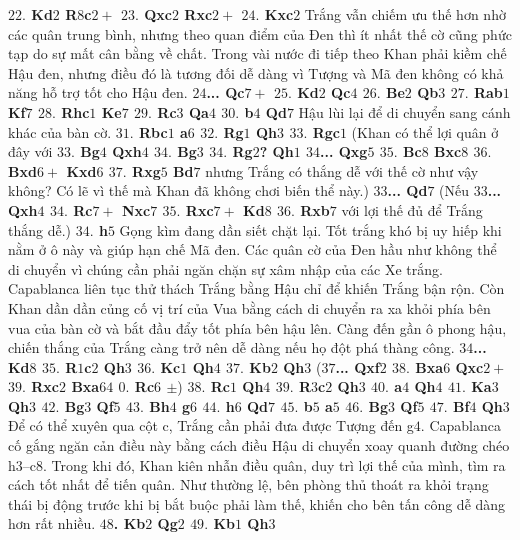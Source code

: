 \begin{multicols}{2}
	\vskip 0.1cm
	\textbf{\color{gocco}$22.$ Kd$2$ R$8$c$2+$ $23.$ Qxc$2$ Rxc$2+$ $24.$ Kxc$2$} Trắng vẫn chiếm ưu thế hơn nhờ các quân trung bình, nhưng theo quan điểm của Đen thì ít nhất thế cờ cũng phức tạp do sự mất cân bằng về chất. Trong vài nước đi tiếp theo Khan phải kiềm chế Hậu đen, nhưng điều đó là tương đối dễ dàng vì Tượng và Mã đen không có khả năng hỗ trợ tốt cho Hậu đen. 
	\vskip 0.1cm
	\textbf{\color{gocco}$24$... Qc$7+$ $25.$ Kd$2$ Qc$4$ $26.$ Be$2$ Qb$3$ $27.$ Rab$1$ Kf$7$ $28.$ Rhc$1$ Ke$7$ $29.$ Rc$3$ Qa$4$ $30.$ b$4$ Qd$7$} Hậu lùi lại để di chuyển sang cánh khác của bàn cờ. \textbf{\color{gocco}$31.$ Rbc$1$ a$6$ $32.$ Rg$1$ Qh$3$ $33.$ Rgc$1$} 
	\vskip 0.1cm
	(Khan có thể lợi quân ở đây với \textbf{\color{gocco}$33.$ Bg$4$ Qxh$4$ $34.$ Bg$3$ $34.$ Rg$2$? Qh$1$ $34$... Qxg$5$ $35.$ Bc$8$ Bxc$8$ $36.$ Bxd$6+$ Kxd$6$ $37.$ Rxg$5$ Bd$7$} nhưng Trắng có thắng dễ với thế cờ như vậy không? Có lẽ vì thế mà Khan đã không chơi biến thể này.) 
	\vskip 0.1cm
	\textbf{\color{gocco}$33$... Qd$7$} 
	(Nếu \textbf{\color{gocco}$33$... Qxh$4$ $34.$ Rc$7+$ Nxc$7$ $35.$ Rxc$7+$ Kd$8$ $36.$ Rxb$7$} với lợi thế đủ để Trắng thắng dễ.)
	\vskip 0.1cm
	\textbf{\color{gocco}$34.$ h$5$} Gọng kìm đang dần siết chặt lại. Tốt trắng khó bị uy hiếp khi nằm ở ô này và giúp hạn chế Mã đen. Các quân cờ của Đen hầu như không thể di chuyển vì chúng cần phải ngăn chặn sự xâm nhập của các Xe trắng. Capablanca liên tục thử thách Trắng bằng Hậu chỉ để khiến Trắng bận rộn. Còn Khan dần dần củng cố vị trí của Vua bằng cách di chuyển ra xa khỏi phía bên vua của bàn cờ và bắt đầu đẩy tốt phía bên hậu lên. Càng đến gần ô phong hậu, chiến thắng của Trắng càng trở nên dễ dàng nếu họ đột phá thàng công.
	\vskip 0.1cm
	\textbf{\color{gocco}$34$... Kd$8$ $35.$ R$1$c$2$ Qh$3$ $36.$ Kc$1$ Qh$4$ $37.$ Kb$2$ Qh$3$} 
	\vskip 0.1cm
	(\textbf{\color{gocco}$37$... Qxf$2$ $38.$ Bxa$6$ Qxc$2+$ $39.$ Rxc$2$ Bxa$64$ $0.$ Rc$6$ $\pm$}) 
	\vskip 0.1cm
	\textbf{\color{gocco}$38.$ Rc$1$ Qh$4$ $39.$ R$3$c$2$ Qh$3$ $40.$ a$4$ Qh$4$ $41.$ Ka$3$ Qh$3$ $42.$ Bg$3$ Qf$5$ $43.$ Bh$4$ g$6$ $44.$ h$6$ Qd$7$ $45.$ b$5$ a$5$ $46.$ Bg$3$ Qf$5$ $47.$ Bf$4$ Qh$3$}
	\vskip 0.1cm
	Để có thể xuyên qua cột c, Trắng cần phải đưa được Tượng đến g$4$. Capablanca cố gắng ngăn cản điều này bằng cách điều Hậu di chuyển xoay quanh đường chéo h$3$--c$8$. Trong khi đó, Khan kiên nhẫn điều quân, duy trì lợi thế của mình, tìm ra cách tốt nhất để tiến quân. Như thường lệ, bên phòng thủ thoát ra khỏi trạng thái bị động trước khi bị bắt buộc phải làm thế, khiến cho bên tấn công dễ dàng hơn rất nhiều. \textbf{\color{gocco}$48$. Kb$2$ Qg$2$ $49.$ Kb$1$ Qh$3$}

\end{multicols}
